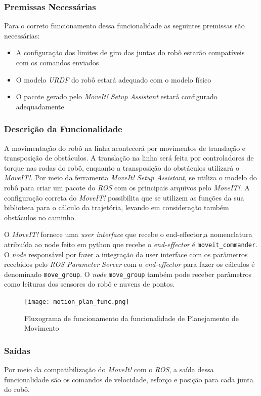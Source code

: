 \subsubsection{Premissas Necessárias}
Para o correto funcionamento dessa funcionalidade as seguintes premissas são necessárias:
\begin{itemize}
	\item A configuração dos limites de giro das juntas do robô estarão compatíveis com os comandos enviados
	\item O modelo \textit{URDF} do robô estará adequado com o modelo físico
	\item O pacote gerado pelo \textit{MoveIt! Setup Assistant} estará configurado adequadamente
\end{itemize}
\subsubsection{Descrição da Funcionalidade}
A movimentação do robô na linha acontecerá por movimentos de translação e transposição de obstáculos. A translação na linha será feita por controladores de torque nas rodas do robô, enquanto a transposição do obstáculos utilizará o \textit{MoveIT!}.
Por meio da ferramenta \textit{MoveIt! Setup Assistant}, se utiliza o modelo do robô para criar um pacote do \textit{ROS} com os principais arquivos pelo \textit{MoveIT!}. 
A configuração correta do \textit{MoveIT!} possibilita que se utilizem as funções da sua biblioteca para o cálculo da trajetória, levando em consideração também obstáculos no caminho.

O \textit{MoveIT!} fornece uma \textit{user interface} que recebe o end-effector,a nomenclatura atribuída ao node feito em python que recebe o \textit{end-effector} é \verb|moveit_commander|. O  \textit{node} responsável por fazer a integração da user interface com os parâmetros recebidos pelo \textit{ROS Parameter Server} com o \textit{end-effector} para fazer os cálculos é denominado \verb|move_group|. O \textit{node} \verb|move_group| também pode receber parâmetros como leituras dos sensores do robô e nuvens de pontos.

\begin{figure}[!h]
	\centering
	\texttt{[image: motion\_plan\_func.png]}
	\caption{Fluxograma de funcionamento da funcionalidade de Planejamento de Movimento}
	\label{fig:flux_motion}
\end{figure}

\subsubsection{Saídas}
Por meio da compatibilização do \textit{MoveIt!} com o \textit{ROS}, a saída dessa funcionalidade são os comandos de velocidade, esforço e posição para cada junta do robô.

